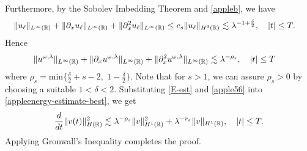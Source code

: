 %
%
Furthermore, by the Sobolev Imbedding Theorem and \cref{appleb}, we have
%
%
%
%
\begin{equation*}
\begin{split}
\|u_\ell\|_{L^\infty(\mathbb{R})} + \|\partial_x u_\ell \|_{L^\infty(\mathbb{R})} + \|\partial_x^2
u_\ell\|_{L^\infty(\mathbb{R})}
& \le c_s \|u_\ell\|_{H^3(\mathbb{R})} 
 \lesssim \lambda^{-1 + \frac{\delta}{2}}, 
\quad |t| \le T.
\label{apple55}
\end{split}
\end{equation*}
%
%
Hence
%
%
\begin{equation}
\begin{split}
\|u^{\omega,\lambda}\|_{L^\infty(\mathbb{R})} + \|\partial_x 
u^{\omega,\lambda}\|_{L^\infty(\mathbb{R})} + \|\partial_x^2
u^{\omega,\lambda}\|_{L^\infty(\mathbb{R})}
& \lesssim \lambda^{-\rho_s}, \quad |t| \le T
\label{apple56}
\end{split}
\end{equation}
%
%
where $\rho_s = \text{min} \Big\{ \frac{\delta}{2} + s -2, \; 1-
\frac{\delta}{2} \Big\}$.  Note that for $s>1$, we can assure $\rho_s > 0$
by choosing a suitable $1<\delta<2$.
Substituting \eqref{E-est} and \eqref{apple56} into \eqref{appleenergy-estimate-best},
we get
%
%
\begin{equation}
\label{apple58}
\frac{d}{dt} \|v(t)\|_{H(\mathbb{R})}^2 \lesssim \lambda^{-\rho_s}
\|v\|_{H^1(\mathbb{R})}^2 + \lambda^{-r_s}
\|v \|_{H^1(\mathbb{R})}, \quad |t| \le T.
\end{equation}
%
%
Applying Gronwall's Inequality completes the proof. \qquad \qedsymbol%
%
%
%
%


